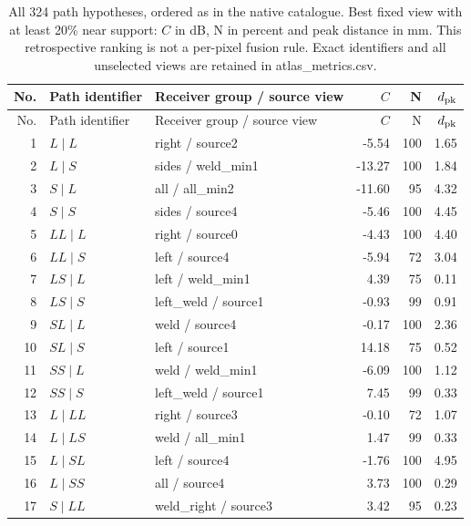 \documentclass[11pt]{article}
\begin{document}
\begingroup\small\setlength{\tabcolsep}{3pt}
\begin{longtable}{@{}r>{\raggedright\arraybackslash}p{.28\linewidth}>{\raggedright\arraybackslash}p{.27\linewidth}rrr@{}}
\caption{All 324 path hypotheses, ordered as in the native catalogue. Best fixed view with at least 20\% near support: $C$ in dB, N in percent and peak distance in mm. This retrospective ranking is not a per-pixel fusion rule. Exact identifiers and all unselected views are retained in atlas\_metrics.csv.}\label{saft:path_register}\\
\toprule No. & Path identifier & Receiver group / source view & $C$ & N & $d_{\rm pk}$\\\midrule\endfirsthead
\toprule No. & Path identifier & Receiver group / source view & $C$ & N & $d_{\rm pk}$\\\midrule\endhead
1 & $L\mid L$ & right / source2 & -5.54 & 100 & 1.65\\
2 & $L\mid S$ & sides / weld\_\allowbreak min1 & -13.27 & 100 & 1.84\\
3 & $S\mid L$ & all / all\_\allowbreak min2 & -11.60 & 95 & 4.32\\
4 & $S\mid S$ & sides / source4 & -5.46 & 100 & 4.45\\
5 & $LL\mid L$ & right / source0 & -4.43 & 100 & 4.40\\
6 & $LL\mid S$ & left / source4 & -5.94 & 72 & 3.04\\
7 & $LS\mid L$ & left / weld\_\allowbreak min1 & 4.39 & 75 & 0.11\\
8 & $LS\mid S$ & left\_\allowbreak weld / source1 & -0.93 & 99 & 0.91\\
9 & $SL\mid L$ & weld / source4 & -0.17 & 100 & 2.36\\
10 & $SL\mid S$ & left / source1 & 14.18 & 75 & 0.52\\
11 & $SS\mid L$ & weld / weld\_\allowbreak min1 & -6.09 & 100 & 1.12\\
12 & $SS\mid S$ & left\_\allowbreak weld / source1 & 7.45 & 99 & 0.33\\
13 & $L\mid LL$ & right / source3 & -0.10 & 72 & 1.07\\
14 & $L\mid LS$ & weld / all\_\allowbreak min1 & 1.47 & 99 & 0.33\\
15 & $L\mid SL$ & left / source4 & -1.76 & 100 & 4.95\\
16 & $L\mid SS$ & all / source4 & 3.73 & 100 & 0.29\\
17 & $S\mid LL$ & weld\_\allowbreak right / source3 & 3.42 & 95 & 0.23\\

\end{longtable}
\end{document}
